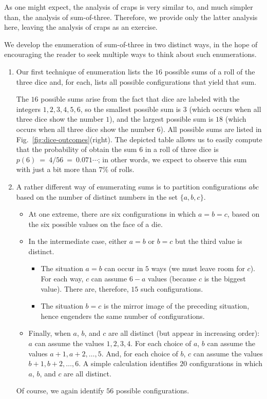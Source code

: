 \bigskip

As one might expect, the analysis of craps is very similar to, and
much simpler than, the analysis of sum-of-three.  Therefore, we provide
only the latter analysis here, leaving the analysis of craps as an
exercise.

We develop the enumeration of sum-of-three in two distinct ways, in
the hope of encouraging the reader to seek multiple ways to think
about such enumerations.
\begin{enumerate}
\item 
Our first technique of enumeration lists the $16$ possible sums of a
roll of the three dice and, for each, lists all possible
configurations that yield that sum.

The $16$ possible sums arise from the fact that dice are
labeled with the integers $1, 2, 3, 4, 5, 6$, so the smallest possible
sum is $3$ (which occurs when all three dice show the number $1$), and
the largest possible sum is $18$ (which occurs when all three dice
show the number $6$).  All possible sums are listed in
Fig.~\ref{fig:dice-outcomes}(right).  The depicted table allows
us to easily compute that the probability of obtain the sum $6$ in a
roll of three dice is $p(6) \ = \ 4/56 \ = \ 0.071\cdots$; in other
words, we expect to observe this sum with just a bit more than
$7\%$ of rolls.

\item 
A rather different way of enumerating sums is to partition
configurations $abc$ based on the number of distinct numbers in the
set $\{ a, b, c\}$.
\begin{itemize}
\item
At one extreme, there are six configurations in which $a = b = c$,
based on the six possible values on the face of a die.
\item
In the intermediate case, either $a=b$ or $b=c$ but the third value is
distinct.
  \begin{itemize}
  \item
The situation $a=b$ can occur in $5$ ways (we must leave room for
$c$).  For each way, $c$ can assume $6-a$ values (because $c$ is the
biggest value).  There are, therefore, $15$ such configurations.
  \item
The situation $b=c$ is the mirror image of the preceding situation,
hence engenders the same number of configurations.
  \end{itemize}

\item
Finally, when $a$, $b$, and $c$ are all distinct (but appear in
increasing order): $a$ can assume the values $1, 2, 3, 4$.  For each
choice of $a$, $b$ can assume the values $a+1, a+2, \ldots, 5$.  And,
for each choice of $b$, $c$ can assume the values $b+1, b+2, \ldots,
6$.  A simple calculation identifies $20$ configurations in which $a$,
$b$, and $c$ are all distinct.
\end{itemize}
Of course, we again identify $56$ possible configurations.
\end{enumerate}

